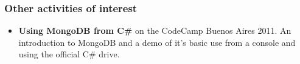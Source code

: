 \subsubsection*{Other activities of interest}

\begin{itemize}
	\item \textbf{Using MongoDB from C\#} on the CodeCamp Buenos Aires 2011.
		\subitem An introduction to MongoDB and a demo of it's basic use from a
			console and using the official C\# drive.
\end{itemize}
